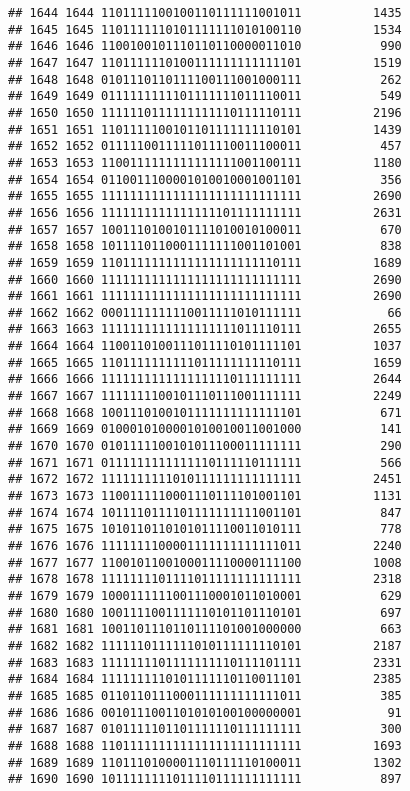 \documentclass[]{article}
\begin{document}
\begin{verbatim}
## 1644 1644 1101111100100110111111001011          1435
## 1645 1645 1101111110101111111010100110          1534
## 1646 1646 1100100101110110110000011010           990
## 1647 1647 1101111110100111111111111101          1519
## 1648 1648 0101110110111100111001000111           262
## 1649 1649 0111111111101111111011110011           549
## 1650 1650 1111110111111111110111110111          2196
## 1651 1651 1101111100101101111111110101          1439
## 1652 1652 0111110011111011110011100011           457
## 1653 1653 1100111111111111111001100111          1180
## 1654 1654 0110011100001010010001001101           356
## 1655 1655 1111111111111111111111111111          2690
## 1656 1656 1111111111111111101111111111          2631
## 1657 1657 1001110100101111010010100011           670
## 1658 1658 1011110110001111111001101001           838
## 1659 1659 1101111111111111111111110111          1689
## 1660 1660 1111111111111111111111111111          2690
## 1661 1661 1111111111111111111111111111          2690
## 1662 1662 0001111111110011111010111111            66
## 1663 1663 1111111111111111111011110111          2655
## 1664 1664 1100110100111011110101111101          1037
## 1665 1665 1101111111111011111111110111          1659
## 1666 1666 1111111111111111110111111111          2644
## 1667 1667 1111111100101110111001111111          2249
## 1668 1668 1001110100101111111111111101           671
## 1669 1669 0100010100001010010011001000           141
## 1670 1670 0101111100101011100011111111           290
## 1671 1671 0111111111111110111110111111           566
## 1672 1672 1111111111010111111111111111          2451
## 1673 1673 1100111110001110111101001101          1131
## 1674 1674 1011110111101111111111001101           847
## 1675 1675 1010110110101011110011010111           778
## 1676 1676 1111111100001111111111111011          2240
## 1677 1677 1100101100100011110000111100          1008
## 1678 1678 1111111101111011111111111111          2318
## 1679 1679 1000111111001110001011010001           629
## 1680 1680 1001111001111110101101110101           697
## 1681 1681 1001101110110111101001000000           663
## 1682 1682 1111110111111010111111110101          2187
## 1683 1683 1111111101111111110111101111          2331
## 1684 1684 1111111110101111110110011101          2385
## 1685 1685 0110110111000111111111111011           385
## 1686 1686 0010111001101010100100000001            91
## 1687 1687 0101111101101111110111111111           300
## 1688 1688 1101111111111111111111111111          1693
## 1689 1689 1101110100001110111110100011          1302
## 1690 1690 1011111111011110111111111111           897

\end{verbatim}
\end{document}
